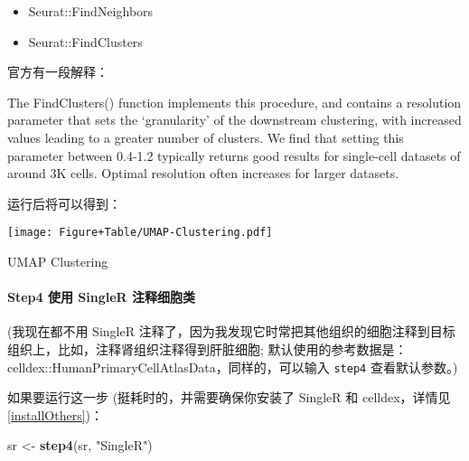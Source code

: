 \documentclass[
]{article}
\newenvironment{Shaded}{\begin{snugshade}}{\end{snugshade}}
\newcommand{\KeywordTok}[1]{\textcolor[rgb]{0.13,0.29,0.53}{\textbf{#1}}}
\newcommand{\NormalTok}[1]{#1}
\newcommand{\OperatorTok}[1]{\textcolor[rgb]{0.81,0.36,0.00}{\textbf{#1}}}
\newcommand{\StringTok}[1]{\textcolor[rgb]{0.31,0.60,0.02}{#1}}
\providecommand{\tightlist}{%
  \setlength{\itemsep}{0pt}\setlength{\parskip}{0pt}}
\begin{document}
\begin{itemize}
\tightlist
\item
  Seurat::FindNeighbors
\item
  Seurat::FindClusters
\end{itemize}

官方有一段解释：

The FindClusters() function implements this procedure, and contains a
resolution parameter that sets the `granularity' of the downstream clustering,
with increased values leading to a greater number of clusters. We find that
setting this parameter between 0.4-1.2 typically returns good results for
single-cell datasets of around 3K cells. Optimal resolution often increases for
larger datasets.

运行后将可以得到：

\begin{Shaded}
\end{Shaded}

\def\@captype{figure}
\begin{center}
\texttt{[image: Figure+Table/UMAP-Clustering.pdf]}
\caption{UMAP Clustering}\label{fig:UMAP-Clustering}
\end{center}

\hypertarget{step4-ux4f7fux7528-singler-ux6ce8ux91caux7ec6ux80deux7c7b}{%
\paragraph{Step4 使用 SingleR 注释细胞类}\label{step4-ux4f7fux7528-singler-ux6ce8ux91caux7ec6ux80deux7c7b}}

(我现在都不用 SingleR 注释了，因为我发现它时常把其他组织的细胞注释到目标组织上，比如，注释肾组织注释得到肝脏细胞;
默认使用的参考数据是：celldex::HumanPrimaryCellAtlasData，同样的，可以输入 \texttt{step4} 查看默认参数。)

如果要运行这一步 (挺耗时的，并需要确保你安装了 SingleR 和 celldex，详情见 \ref{installOthers})：

\begin{Shaded}
\begin{Highlighting}[]
\NormalTok{sr \textless{}{-}}\StringTok{ }\KeywordTok{step4}\NormalTok{(sr, }\StringTok{"SingleR"}\NormalTok{)}
\end{Highlighting}
\end{Shaded}
\end{document}
